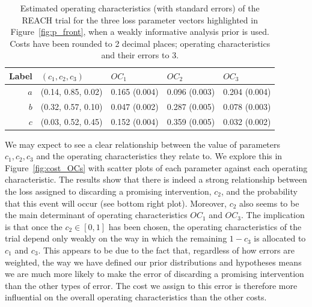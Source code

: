 \documentclass{article} %
\begin{document}
\begin{table}
\caption{Estimated operating characteristics (with standard errors) of the REACH trial for the three loss parameter vectors highlighted in Figure~\ref{fig:p_front}, when a weakly informative analysis prior is used. Costs have been rounded to 2 decimal places; operating characteristics and their errors to 3.}
\begin{tabular}{r l l l l}
\toprule
Label & $(c_{1}, c_{2}, c_{3})$ & $OC_{1}$ & $OC_{2}$ & $OC_{3}$ \\
\midrule
$a$ & (0.14, 0.85, 0.02) & 0.165 (0.004) & 0.096 (0.003) & 0.204 (0.004) \\
$b$ & (0.32, 0.57, 0.10) & 0.047 (0.002) & 0.287 (0.005) & 0.078 (0.003)  \\
$c$ & (0.03, 0.52, 0.45) & 0.152 (0.004) & 0.359 (0.005) & 0.032 (0.002)  \\
\bottomrule
\end{tabular}
\label{tab:costs}
\end{table}

We may expect to see a clear relationship between the value of parameters $c_1, c_2, c_3$ and the operating characteristics they relate to. We explore this in Figure~\ref{fig:cost_OCs} with scatter plots of each  parameter against each operating characteristic. The results show that there is indeed a strong relationship between the loss assigned to discarding a promising intervention, $c_2$, and the probability that this event will occur (see bottom right plot). Moreover, $c_2$ also seems to be the main determinant of operating characteristics $OC_1$ and $OC_3$. The implication is that once the $c_2 \in [0,1]$ has been chosen, the operating characteristics of the trial depend only weakly on the way in which the remaining $1-c_3$ is allocated to $c_1$ and $c_3$. This appears to be due to the fact that, regardless of how errors are weighted, the way we have defined our prior distributions and hypotheses means we are much more likely to make the error of discarding a promising intervention than the other types of error. The cost we assign to this error is therefore more influential on the overall operating characteristics than the other costs.
\end{document}
